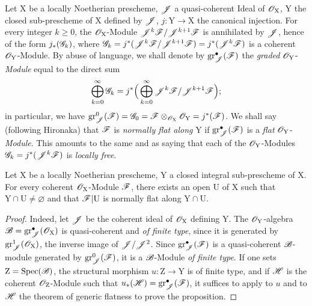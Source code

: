 \begin{env}[6.10.1]
\label{IV.6.10.1}
Let $\mathrm{X}$ be a locally Noetherian prescheme, $\mathscr{J}$ a quasi-coherent Ideal of $\mathscr{O}_\mathrm{X}$, $\mathrm{Y}$ the closed sub-prescheme of $\mathrm{X}$ defined by $\mathscr{J}$, $j:\mathrm{Y}\to\mathrm{X}$ the canonical injection. For every integer $k\geqslant 0$, the $\mathscr{O}_\mathrm{X}$-Module $\mathscr{J}^k\mathscr{F}/\mathscr{J}^{k+1}\mathscr{F}$ is annihilated by $\mathscr{J}$, hence of the form $j_*(\mathscr{G}_k)$, where $\mathscr{G}_k=j^*(\mathscr{J}^k\mathscr{F}/\mathscr{J}^{k+1}\mathscr{F})=j^*(\mathscr{J}^k\mathscr{F})$ is a coherent $\mathscr{O}_\mathrm{Y}$-Module. By abuse of language, we shall denote by $\operatorname{gr}^{\bullet}_{\mathscr{J}}(\mathscr{F})$ the \emph{graded} $\mathscr{O}_\mathrm{Y}$-\emph{Module} equal to the direct sum
\[
\bigoplus_{k=0}^{\infty}\mathscr{G}_k = j^*\Big(\bigoplus_{k=0}^{\infty}\mathscr{J}^k\mathscr{F}/\mathscr{J}^{k+1}\mathscr{F}\Big);
\]
  in particular, we have $\operatorname{gr}^0_{\mathscr{J}}(\mathscr{F})=\mathscr{G}_0=\mathscr{F}\otimes_{\mathscr{O}_\mathrm{X}}\mathscr{O}_\mathrm{Y}=j^*(\mathscr{F})$. We shall say (following Hironaka) that $\mathscr{F}$ is \emph{normally flat along} $\mathrm{Y}$ if $\operatorname{gr}^{\bullet}_{\mathscr{J}}(\mathscr{F})$ is a \emph{flat} $\mathscr{O}_\mathrm{Y}$-\emph{Module}. This amounts to the same  and  as saying that each of the $\mathscr{O}_\mathrm{Y}$-Modules $\mathscr{G}_k=j^*(\mathscr{J}^k\mathscr{F})$ is \emph{locally free}.
\end{env}

\begin{proposition}[6.10.2]
\label{IV.6.10.2}
Let $\mathrm{X}$ be a locally Noetherian prescheme, $\mathrm{Y}$ a closed \textup{integral} sub-prescheme of $\mathrm{X}$. For every coherent $\mathscr{O}_\mathrm{X}$-Module $\mathscr{F}$, there exists an open $\mathrm{U}$ of $\mathrm{X}$ such that $\mathrm{Y}\cap\mathrm{U}\neq\varnothing$ and that $\mathscr{F}|\mathrm{U}$ is normally flat along $\mathrm{Y}\cap\mathrm{U}$.
\end{proposition}

\begin{proof}
Indeed, let $\mathscr{J}$ be the coherent ideal of $\mathscr{O}_\mathrm{X}$ defining $\mathrm{Y}$. The $\mathscr{O}_\mathrm{Y}$-algebra $\mathscr{B}=\operatorname{gr}^{\bullet}_{\mathscr{J}}(\mathscr{O}_\mathrm{X})$ is quasi-coherent and \emph{of finite type}, since it is generated by $\operatorname{gr}^1_{\mathscr{J}}(\mathscr{O}_\mathrm{X})$, the inverse image of $\mathscr{J}/\mathscr{J}^2$. Since $\operatorname{gr}^{\bullet}_{\mathscr{J}}(\mathscr{F})$ is a quasi-coherent $\mathscr{B}$-module generated by $\operatorname{gr}^0_{\mathscr{J}}(\mathscr{F})$, it is a $\mathscr{B}$-Module \emph{of finite type}. If one sets $\mathrm{Z}=\operatorname{Spec}(\mathscr{B})$, the structural morphism $u:\mathrm{Z}\to\mathrm{Y}$ is of finite type, and if $\mathscr{H}$ is the coherent $\mathscr{O}_\mathrm{Z}$-Module such that $u_*(\mathscr{H})=\operatorname{gr}^{\bullet}_{\mathscr{J}}(\mathscr{F})$, it suffices to apply to $u$ and to $\mathscr{H}$ the theorem of generic flatness  to prove the proposition.
\end{proof}

